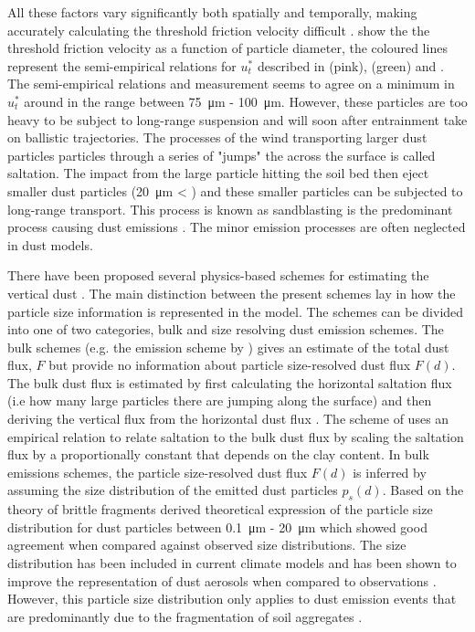 All these factors vary significantly both spatially and temporally, making accurately calculating the threshold friction velocity difficult .  show the the threshold friction velocity as a function of particle diameter, the coloured lines represent the semi-empirical relations for $u^*_t$ described in \textcite{iversen1982saltation} (pink), \textcite{shao2000simple} (green) and \textcite{bagnold1941physics}.
The semi-empirical relations and measurement seems to agree on a minimum in $u^*_t$ around in the range between  \SI{75}{\micro\metre} - \SI{100}{\micro\metre}.
However, these particles are too heavy to be subject to long-range suspension and will soon after entrainment take on ballistic trajectories.
The processes of the wind transporting larger dust particles particles through a series of "jumps" the across the surface is called saltation. 
The impact from the large particle hitting the soil bed then eject smaller dust particles (\SI{20}{\micro\metre} < ) and 
these smaller particles can be subjected to long-range transport. This process is known as sandblasting is the predominant process causing dust emissions \parencite{kok2012physics}. The minor emission processes are often neglected in dust models.

There have been proposed several physics-based schemes for estimating the vertical dust \parencite{MB95_dust_emission,alfaro2001modeling,shao2004simplification}. 
The main distinction between the present schemes lay in how the particle size information is represented in the model. The schemes can be divided into one of two categories, bulk and size resolving dust emission schemes.
The bulk schemes (e.g. the emission scheme by \parencite{MB95_dust_emission}) gives an estimate of the total dust flux, $F$ but provide no information about particle size-resolved dust flux $F(d)$. The bulk dust flux is estimated by first calculating the horizontal saltation flux (i.e how many large particles there are jumping along the surface) and then deriving the vertical flux from the horizontal dust flux \parencite{tegen2014numerical}.
The scheme of \textcite{MB95_dust_emission} uses an empirical relation to relate saltation to the bulk dust flux by scaling the saltation flux by a proportionally constant that depends on the clay content. In bulk emissions schemes, the particle size-resolved dust flux $F(d)$ is inferred by assuming the size distribution of the emitted dust particles $p_s(d)$.
Based on the theory of brittle fragments \textcite{kok_scaling_2011} derived theoretical expression of the particle size distribution for dust particles between \SI{0.1}{\micro\metre} - \SI{20}{\micro\metre} which showed good agreement when compared against observed size distributions. 
The \textcite{kok_scaling_2011} size distribution has been included in current climate models and has been shown to improve the representation of dust aerosols when compared to observations \parencite{johnson2012global}.
However, this particle size distribution only applies to dust emission events that are predominantly due to the fragmentation of soil aggregates \parencite{kok2012physics}.

